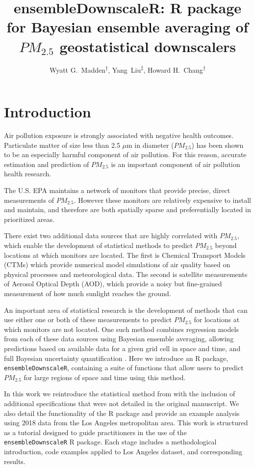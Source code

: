\documentclass[12pt]{article}
\title{ensembleDownscaleR: R package for Bayesian ensemble averaging of $PM_{2.5}$ geostatistical downscalers}
\author{Wyatt G.\relax ~Madden\textsuperscript{$\dagger$}, Yang\relax ~Liu\textsuperscript{$\ddagger$}, Howard H.\relax ~Chang\textsuperscript{$\dagger$}}
\date{}
\begin{document}
\maketitle

\section*{Introduction}

Air pollution exposure is strongly associated with negative health outcomes. 
Particulate matter of size less than 2.5 $\mu$m in diameter ($PM_{2.5}$) has been shown to be an especially harmful component of air pollution. 
For this reason, accurate estimation and prediction of $PM_{2.5}$ is an important component of air pollution health research.  

The U.S. EPA maintains a network of monitors that provide precise, direct measurements of $PM_{2.5}$. 
However these monitors are relatively expensive to install and maintain, and therefore are both spatially sparse and preferentially located in prioritized areas. 

There exist two additional data sources that are highly correlated with $PM_{2.5}$, which enable the development of statistical methods to predict $PM_{2.5}$ beyond locations at which monitors are located. 
The first is Chemical Transport Models (CTMs) which provide numerical model simulations of air quality based on physical processes and meteorological data. 
The second is satellite measurements of Aerosol Optical Depth (AOD), which provide a noisy but fine-grained measurement of how much sunlight reaches the ground. 



An important area of statistical research is the development of methods that can use either one or both of these measurements to predict $PM_{2.5}$ for locations at which monitors are not located. 
One such method combines regression models from each of these data sources using Bayesian ensemble averaging, allowing predictions based on available data for a given grid cell in space and time, and full Bayesian uncertainty quantification \cite{murray2019}. 
Here we introduce an R package, \texttt{ensembleDownscaleR}, containing a suite of functions that allow users to predict $PM_{2.5}$ for large regions of space and time using this method.

In this work we reintroduce the statistical method from \cite{murray2019} with the inclusion of additional specifications that were not detailed in the original manuscript. 
We also detail the functionality of the R package and provide an example analysis using 2018 data from the Los Angeles metropolitan area. 
This work is structured as a tutorial designed to guide practitioners in the use of the \texttt{ensembleDownscaleR} R package. 
Each stage includes a methodological introduction, code examples applied to Los Angeles dataset, and corresponding results. 
\end{document}
